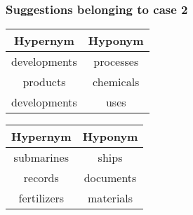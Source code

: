 \documentclass[11pt]{article}
\begin{document}
\subsubsection{Suggestions belonging to case 2}
\begin{minipage}[b]{0.5\linewidth}\centering
\begin{tabular}{c c}
Hypernym & Hyponym \\ \hline
developments & processes \\
products & chemicals \\
developments & uses \\
\end{tabular}
\end{minipage}
\hspace{0.5cm}
\begin{minipage}[b]{0.5\linewidth}
\centering
\begin{tabular}{c c}
Hypernym & Hyponym \\ \hline
submarines & ships \\
records & documents \\
fertilizers & materials \\
\end{tabular}
\end{minipage}
\end{document}
